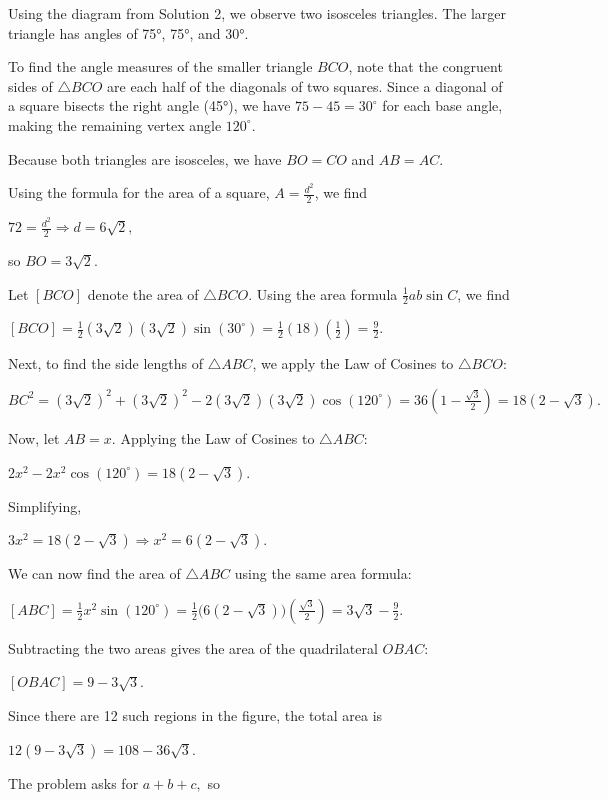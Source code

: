 \begin{enumerate}
Using the diagram from Solution 2, we observe two isosceles triangles. The larger triangle has angles of 75°, 75°, and 30°.

 To find the angle measures of the smaller triangle \(BCO\), note that the congruent sides of \(\triangle BCO\) are each half of the diagonals of two squares. Since a diagonal of a square bisects the right angle (45°), we have \(75 - 45 = 30^\circ\) for each base angle, making the remaining vertex angle \(120^\circ\).

 Because both triangles are isosceles, we have \(BO = CO\) and \(AB = AC\).

 Using the formula for the area of a square, $A = \frac{d^2}{2}$, we find

 $72 = \frac{d^2}{2} \Rightarrow d = 6\sqrt{2},$

 so $BO = 3\sqrt{2}.$

 Let $[BCO]$ denote the area of \(\triangle BCO\). Using the area formula $\frac{1}{2}ab\sin C$, we find

 $[BCO] = \frac{1}{2}(3\sqrt{2})(3\sqrt{2})\sin(30^\circ) = \frac{1}{2}(18)\left(\frac{1}{2}\right) = \frac{9}{2}.$

 Next, to find the side lengths of \(\triangle ABC\), we apply the Law of Cosines to \(\triangle BCO\):

 $BC^2 = (3\sqrt{2})^2 + (3\sqrt{2})^2 - 2(3\sqrt{2})(3\sqrt{2})\cos(120^\circ) = 36(1 - \frac{\sqrt{3}}{2}) = 18(2 - \sqrt{3}).$

 Now, let $AB = x.$ Applying the Law of Cosines to \(\triangle ABC\):

 $2x^2 - 2x^2\cos(120^\circ) = 18(2 - \sqrt{3}).$

 Simplifying,

 $3x^2 = 18(2 - \sqrt{3}) \Rightarrow x^2 = 6(2 - \sqrt{3}).$

 We can now find the area of \(\triangle ABC\) using the same area formula:

 $[ABC] = \frac{1}{2}x^2\sin(120^\circ) = \frac{1}{2}\bigl(6(2 - \sqrt{3})\bigr)\left(\frac{\sqrt{3}}{2}\right) = 3\sqrt{3} - \frac{9}{2}.$

 Subtracting the two areas gives the area of the quadrilateral \(OBAC\):

 $[OBAC] = 9 - 3\sqrt{3}.$

 Since there are 12 such regions in the figure, the total area is

 $12(9 - 3\sqrt{3}) = 108 - 36\sqrt{3}.$

 The problem asks for \(a + b + c,\) so


\end{enumerate}
